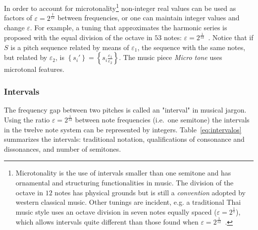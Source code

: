 In order to account for microtonality\footnote{Microtonality is the use of intervals smaller
than one semitone and has ornamental and structuring functionalities in music. The division of the octave in $12$ notes has physical grounds but is still a \emph{convention} adopted by western classical music. Other tunings are incident, e.g. a traditional Thai music style uses an octave division in seven notes equally spaced ($\varepsilon=2^{\frac{1}{7}}$),
which allows intervals quite different than those found when $\varepsilon=2^{\frac{1}{12}}$~\cite{Wisnick}.} non-integer real values can be used as factors of $\varepsilon=2^{\frac{1}{12}}$ between frequencies, or one can maintain integer values and change $\varepsilon$. For example, a tuning that approximates the harmonic series
is proposed with the equal division of the octave in $53$ notes:
$\varepsilon=2^{\frac{1}{53}}$~\cite{microtonalidade}.
Notice that if $S$ is a pitch sequence related by means of $\varepsilon_1$,
the sequence with the same notes, but related by $\varepsilon_2$, is 
$\left\{s_i'\right\}=\left\{
s_i \frac{\varepsilon_1}{\varepsilon_2}\right\}$. The music piece \emph{Micro
tone} uses microtonal features.~\cite{MASSA}

\subsubsection{Intervals}\label{subsec:intervalos}
The frequency gap between two pitches is called an "interval" in musical jargon.
Using the ratio $\varepsilon=2^{\frac{1}{12}}$ between note frequencies (i.e.\ one semitone) the intervals in the twelve note system can be represented by integers. Table~\ref{eq:intervalos} summarizes the intervals: traditional notation, qualifications of consonance and
dissonances, and number of semitones.

